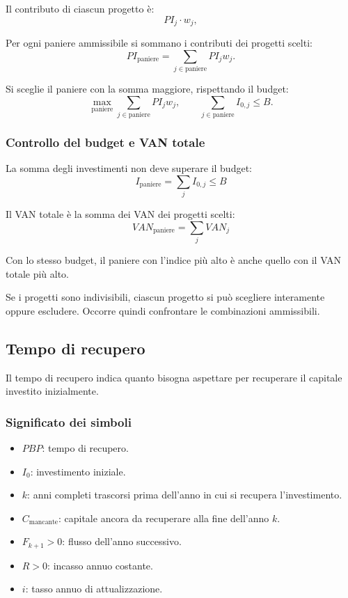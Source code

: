 Il contributo di ciascun progetto è:
\[
PI_j \cdot w_j,
\]

Per ogni paniere ammissibile si sommano i contributi
dei progetti scelti:
\[
PI_{\text{paniere}}=\sum_{j\in\text{paniere}} PI_jw_j.
\]

Si sceglie il paniere con la somma maggiore,
rispettando il budget:
\[
\max_{\text{paniere}}\sum_{j\in\text{paniere}} PI_jw_j,
\qquad
\sum_{j\in\text{paniere}} I_{0,j}\leq B.
\]

\subsubsection*{Controllo del budget e VAN totale}

\noindent
La somma degli investimenti non deve superare il budget:
\[
    I_{\text{paniere}}
    =
    \sum_j I_{0,j}
    \leq B
\]

\noindent
Il VAN totale è la somma dei VAN dei progetti scelti:
\[
    VAN_{\text{paniere}}=\sum_j VAN_j
\]

\noindent
Con lo stesso budget, il paniere con l'indice più alto
è anche quello con il VAN totale più alto.

\noindent
Se i progetti sono indivisibili, ciascun progetto
si può scegliere interamente oppure escludere.
Occorre quindi confrontare le combinazioni ammissibili.

\subsection{Tempo di recupero}

\noindent
Il tempo di recupero indica quanto bisogna aspettare
per recuperare il capitale investito inizialmente.

\subsubsection*{Significato dei simboli}

\begin{itemize}
    \item $PBP$: tempo di recupero.
    \item $I_0$: investimento iniziale.
    \item $k$: anni completi trascorsi prima dell'anno
        in cui si recupera l'investimento.
    \item $C_{\text{mancante}}$: capitale ancora da recuperare
        alla fine dell'anno $k$.
    \item $F_{k+1}>0$: flusso dell'anno successivo.
    \item $R>0$: incasso annuo costante.
    \item $i$: tasso annuo di attualizzazione.
\end{itemize}

